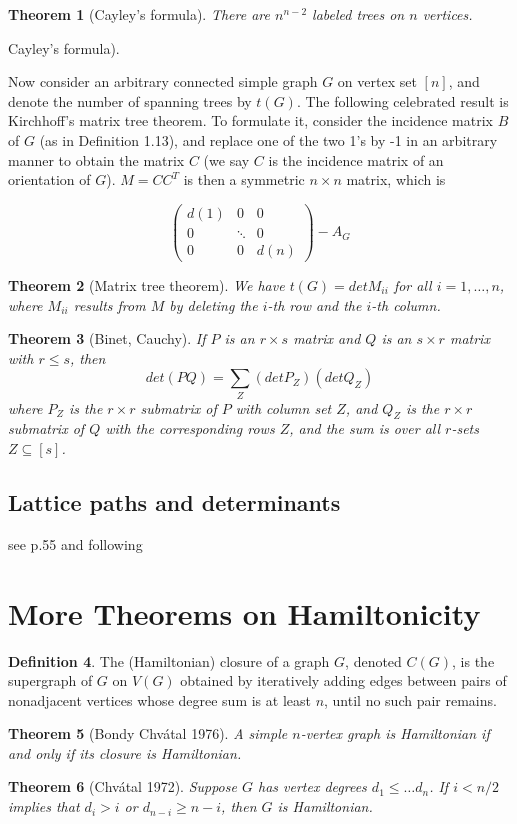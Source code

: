 \documentclass[10pt, fleqn, a4paper, landscape]{article}
\theoremstyle{plain} %
\newtheorem{thm}{Theorem}
\theoremstyle{remark} %
\theoremstyle{definition} %
\newtheorem{defi}[thm]{Definition}
\begin{document}
\begin{multicols}{3}
\begin{tiny}
\begin{thm}[Cayley's formula]
There are $n^{n-2}$ labeled trees on $n$ vertices.
\end{thm}Cayley’s formula). 

Now consider an arbitrary connected simple graph $G$ on vertex set $[n]$, and denote the number of spanning trees by $t(G)$. The following celebrated result is Kirchhoff’s matrix tree theorem. To formulate it, consider the incidence matrix $B$ of $G$ (as in Definition 1.13), and replace one of the
two 1’s by -1 in an arbitrary manner to obtain the matrix $C$ (we say $C$ is the incidence matrix of an orientation of $G$). $ M = CC^T$ is then a symmetric $n \times n$ matrix, which is 

\[
\begin{pmatrix}
d(1) & 0 & 0  \\
0 & \ddots & 0  \\
0 & 0 & d(n)  
\end{pmatrix}-A_G\]

\begin{thm}[Matrix tree theorem]
We have $t(G) = det M_{ii}$ for all $i = 1, \dots , n$, where $M_{ii}$ results
from $M$ by deleting the $i$-th row and the $i$-th column.
\end{thm}

\begin{thm}[Binet,  Cauchy]
If $P$ is an $r \times s$ matrix and $Q$ is an $s \times r$ matrix with $r\le s$, then \[det(PQ) =\sum_Z (det P_Z)(detQ_Z)\]
where $P_Z$ is the $r\times r$ submatrix of $P$ with column set $Z$, and $Q_Z$ is the $r\times r$ submatrix of $Q$ with the corresponding rows $Z$, and the sum is over all $r$-sets $Z \subseteq [s]$.
\end{thm}

\subsection{Lattice paths and determinants}
see p.55 and following

\section{More Theorems on Hamiltonicity}
\begin{defi}
The (Hamiltonian) closure of a graph $G$, denoted $C(G)$, is the supergraph of $G$ on $V (G)$ obtained by iteratively adding edges between pairs of nonadjacent vertices whose degree sum is at least $n$, until no such pair remains.
\end{defi}
\begin{thm}[Bondy Chvátal 1976]
A simple $n$-vertex graph is Hamiltonian if and only if its closure is Hamiltonian.
\end{thm}
\begin{thm}[Chvátal 1972]
Suppose $G$ has vertex degrees $d_1\le \dots d_n$. If $i < n/2$ implies
that $d_i > i$ or $d_{n-i} \ge n - i$, then $G$ is Hamiltonian.
\end{thm}


\end{tiny}
\end{multicols}
\end{document}
